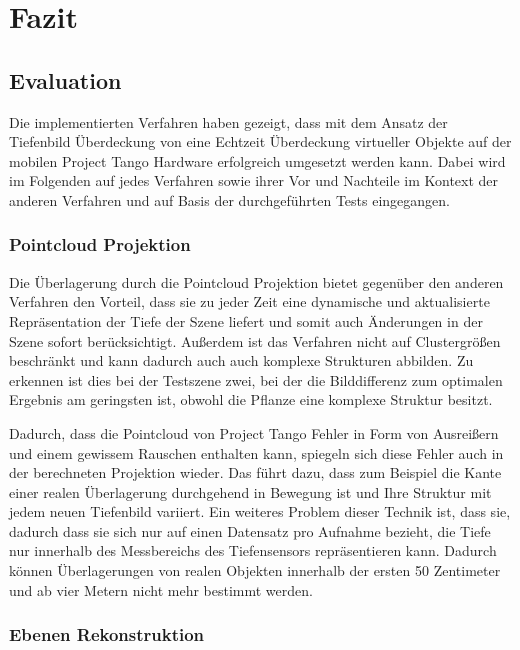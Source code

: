 \chapter{Fazit} \label{sec:conclusion}

\section{Evaluation}

Die implementierten Verfahren haben gezeigt, dass mit dem Ansatz der Tiefenbild Überdeckung von \citet{wloka1995resolving} eine Echtzeit Überdeckung virtueller Objekte auf der mobilen Project Tango Hardware erfolgreich umgesetzt werden kann. Dabei wird im Folgenden auf jedes Verfahren sowie ihrer Vor und Nachteile im Kontext der anderen Verfahren und auf Basis der durchgeführten Tests eingegangen. 

\subsection*{Pointcloud Projektion}

Die Überlagerung durch die Pointcloud Projektion bietet gegenüber den anderen Verfahren den Vorteil, dass sie zu jeder Zeit eine dynamische und aktualisierte Repräsentation der Tiefe der Szene liefert und somit auch Änderungen in der Szene sofort berücksichtigt. Außerdem ist das Verfahren nicht auf Clustergrößen beschränkt und kann dadurch auch auch komplexe Strukturen abbilden. Zu erkennen ist dies bei der Testszene zwei, bei der die Bilddifferenz zum optimalen Ergebnis am geringsten ist, obwohl die Pflanze eine komplexe Struktur besitzt.

Dadurch, dass die Pointcloud von Project Tango Fehler in Form von Ausreißern und einem gewissem Rauschen enthalten kann, spiegeln sich diese Fehler auch in der berechneten Projektion wieder. Das führt dazu, dass zum Beispiel die Kante einer realen Überlagerung durchgehend in Bewegung ist und Ihre Struktur mit jedem neuen Tiefenbild variiert. Ein weiteres Problem dieser Technik ist, dass sie, dadurch dass sie sich nur auf einen Datensatz pro Aufnahme bezieht, die Tiefe nur innerhalb des Messbereichs des Tiefensensors repräsentieren kann. Dadurch können Überlagerungen von realen Objekten innerhalb der ersten 50 Zentimeter und ab vier Metern nicht mehr bestimmt werden.

\subsection*{Ebenen Rekonstruktion}

